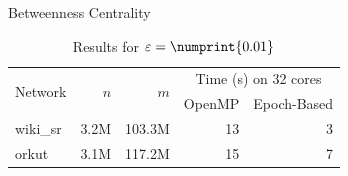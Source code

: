 \documentclass[10pt,titlepage,english,presentation]{beamer}
\begin{document}
\begin{frame}[t]{Betweenness Centrality}
\begin{minipage}[t]{.5\textwidth}
\begin{table}
\setlength{\tabcolsep}{3pt}
\scriptsize
\begin{tabular}{lrrrr}
\toprule
\multirow{2}{*}{Network} & \multirow{2}{*}{$n$} & \multirow{2}{*}{$m$} & \multicolumn{2}{c}{Time (s) on 32 cores} \\
 & & & OpenMP & Epoch-Based\\
\midrule
wiki\_sr & 3.2M & 103.3M & 13 & 3 \\
orkut & 3.1M & 117.2M & 15 & 7\\
\bottomrule
\end{tabular}
\caption*{\scriptsize Results for $\epsilon = \numprint{0.01}$}
\end{table}
\end{minipage}
\end{frame}
\end{document}
